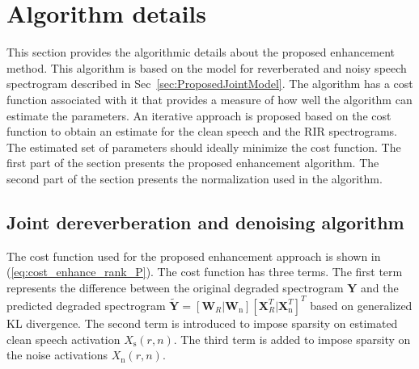\section{Algorithm details}
\label{sec:cost_fn}
This section provides the algorithmic details about the proposed enhancement method. This algorithm is based on the model for reverberated and noisy speech spectrogram described in Sec~\ref{sec:ProposedJointModel}. The algorithm has a cost function associated with it that provides a measure of how well the algorithm can estimate the parameters.
An iterative approach is proposed based on the cost function to obtain an estimate for the clean speech and the RIR spectrograms.  The estimated set of parameters should ideally minimize the cost function. The first part of the section presents the proposed  enhancement algorithm. The second part of the section presents the normalization used in the algorithm.
\subsection{Joint dereverberation and denoising algorithm}
The cost function used for the proposed enhancement approach is shown in (\ref{eq:cost_enhance_rank_P}). The cost function has three terms. The  first term represents the difference between the original degraded spectrogram $\mathbf{Y}$ and the predicted degraded spectrogram $\mathbf{\tilde{Y}} = [\mathbf{W}_R | \mathbf{W}_{\text{n}}][\mathbf{X}_R^T| \mathbf{X}_{\text{n}}^T]^T$ based on generalized KL divergence. The second term is introduced to impose sparsity on estimated clean speech activation $X_{\text{s}}(r,n)$. The third term is added to impose sparsity on the noise activations $X_{\text{n}}(r,n)$. 

